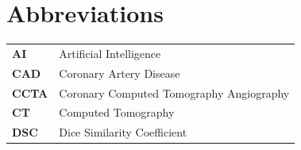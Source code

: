 \chapter*{Abbreviations}

\newcommand{\abbrev}[2]{\textbf{#1} & #2 \\}
\renewcommand{\arraystretch}{1.1}
\noindent
\begin{longtable}{@{}p{2.6cm}@{}p{\dimexpr\linewidth-2.6cm\relax}@{}}
\abbrev{AI}{Artificial Intelligence}
\abbrev{CAD}{Coronary Artery Disease}
\abbrev{CCTA}{Coronary Computed Tomography Angiography}
\abbrev{CT}{Computed Tomography}
\abbrev{DSC}{Dice Similarity Coefficient}
\end{longtable}
